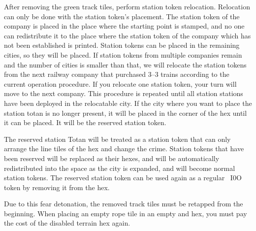 \documentclass{article}
\begin{document}
\begin{CJK}{UTF8}{min}
After removing the green track tiles, perform station token
relocation. Relocation can only be done with the station token's
placement. The station token of the company is placed in the place
where the starting point is stamped, and no one can redistribute it to
the place where the station token of the company which has not been
established is printed. Station tokens can be placed in the remaining
cities, so they will be placed. If station tokens from multiple
companies remain and the number of cities is smaller than that, we
will relocate the station tokens from the next railway company that
purchased 3–3 trains according to the current operation procedure. If
you relocate one station token, your turn will move to the next
company. This procedure is repeated until all station stations have
been deployed in the relocatable city. If the city where you want to
place the station totan is no longer present, it will be placed in the
corner of the hex until it can be placed. It will be the reserved
station token.

The reserved station Totan will be treated as a station token that can
only arrange the line tiles of the hex and change the crime. Station
tokens that have been reserved will be replaced as their hexes, and
will be automatically redistributed into the space as the city is
expanded, and will become normal station tokens. The reserved station
token can be used again as a regular \ I0O token by removing it from
the hex.

Due to this fear detonation, the removed track tiles must be retapped
from the beginning. When placing an empty rope tile in an empty and
hex, you must pay the cost of the disabled terrain hex again.








\end{CJK}
\end{document}
